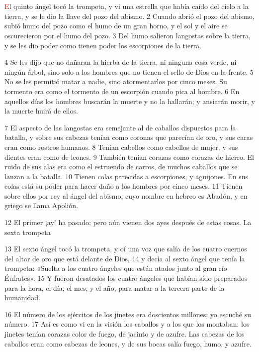 \documentclass[12pt,twocolumn,twoside]{book}
\begin{document}
\chapter{}
\lettrine[lines=4]{\textcolor{red}{E}}{}l quinto ángel tocó la trompeta, y vi una estrella que había caído del cielo a la tierra, y se le dio la llave del pozo del abismo. 2 Cuando abrió el pozo del abismo, subió humo del pozo como el humo de un gran horno, y el sol y el aire se oscurecieron por el humo del pozo. 3 Del humo salieron langostas sobre la tierra, y se les dio poder como tienen poder los escorpiones de la tierra.

4 Se les dijo que no dañaran la hierba de la tierra, ni ninguna cosa verde, ni ningún árbol, sino solo a los hombres que no tienen el sello de Dios en la frente. 5 No se les permitió matar a nadie, sino atormentarlos por cinco meses. Su tormento era como el tormento de un escorpión cuando pica al hombre. 6 En aquellos días los hombres buscarán la muerte y no la hallarán; y ansiarán morir, y la muerte huirá de ellos.

7 El aspecto de las langostas era semejante al de caballos dispuestos para la batalla, y sobre sus cabezas tenían como coronas que parecían de oro, y sus caras eran como rostros humanos. 8 Tenían cabellos como cabellos de mujer, y sus dientes eran como de leones. 9 También tenían corazas como corazas de hierro. El ruido de sus alas era como el estruendo de carros, de muchos caballos que se lanzan a la batalla. 10 Tienen colas parecidas a escorpiones, y aguijones. En sus colas está su poder para hacer daño a los hombres por cinco meses. 11 Tienen sobre ellos por rey al ángel del abismo, cuyo nombre en hebreo es Abadón, y en griego se llama Apolión.

12 El primer ¡ay! ha pasado; pero aún vienen dos ayes después de estas cosas.
La sexta trompeta

13 El sexto ángel tocó la trompeta, y oí una voz que salía de los cuatro cuernos del altar de oro que está delante de Dios, 14 y decía al sexto ángel que tenía la trompeta: «Suelta a los cuatro ángeles que están atados junto al gran río Éufrates». 15 Y fueron desatados los cuatro ángeles que habían sido preparados para la hora, el día, el mes, y el año, para matar a la tercera parte de la humanidad.

16 El número de los ejércitos de los jinetes era doscientos millones; yo escuché su número. 17 Así es como vi en la visión los caballos y a los que los montaban: los jinetes tenían corazas color de fuego, de jacinto y de azufre. Las cabezas de los caballos eran como cabezas de leones, y de sus bocas salía fuego, humo, y azufre.
\end{document}
